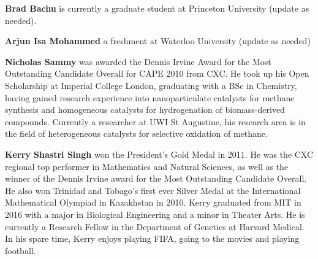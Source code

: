\textbf{Brad Bachu} is currently a graduate student at Princeton
University (update as needed).

\vspace{5pt}

\noindent\textbf{Arjun Isa Mohammed} a freshment at Waterloo University
(update as needed)

\vspace{5pt}

\noindent\textbf{Nicholas Sammy} was awarded the Dennis Irvine Award for the Most Outstanding Candidate Overall for CAPE 2010 from CXC. He took up his Open Scholarship at Imperial College London, graduating with a BSc in Chemistry, having gained research experience into nanoparticulate catalysts for methane synthesis and homogeneous catalysts for hydrogenation of biomass-derived compounds. Currently a researcher at UWI St Augustine, his research area is in the field of heterogeneous catalysts for selective oxidation of methane.

\vspace{5pt}

\noindent\textbf{Kerry Shastri Singh} won the President's Gold Medal in 2011. He was the CXC regional top performer in Mathematics and Natural Sciences, as well as the winner of the Dennis Irvine award for the Most Outstanding Candidate Overall. He also won Trinidad and Tobago's first ever Silver Medal at the International Mathematical Olympiad in Kazakhstan in 2010. Kerry graduated from MIT in 2016 with a major in Biological Engineering and a minor in Theater Arts. He is currently a Research Fellow in the Department of Genetics at Harvard Medical. In his spare time, Kerry enjoys playing FIFA, going to the movies and playing football.
